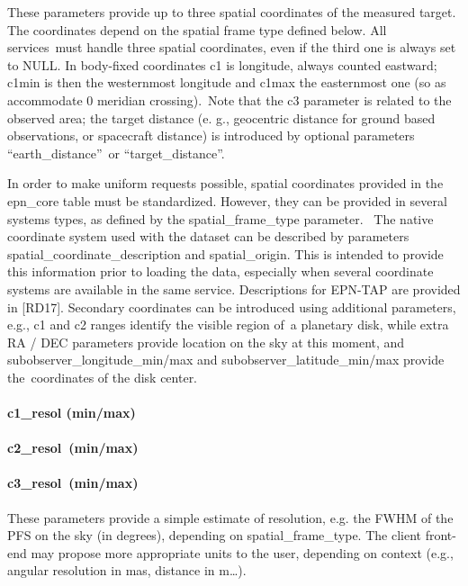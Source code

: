 \documentclass[11pt,a4paper]{ivoa}
\begin{document}
These parameters provide up to three spatial coordinates of the measured target. The coordinates depend on the spatial frame type defined below. All services must handle three spatial coordinates, even if the third one is always set to NULL. In body-fixed coordinates c1 is longitude, always counted eastward; c1min is then the westernmost longitude and c1max the easternmost one (so as accommodate 0 meridian crossing). Note that the c3 parameter is related to the observed area; the target distance (e. g., geocentric distance for ground based observations, or spacecraft distance) is introduced by optional parameters  ``earth\_distance'' or ``target\_distance''.

In order to make uniform requests possible, spatial coordinates provided in the epn\_core table must be standardized. However, they can be provided in several systems types, as defined by the spatial\_frame\_type parameter.  The native coordinate system used with the dataset can be described by parameters spatial\_coordinate\_description and spatial\_origin. This is intended to provide this information prior to loading the data, especially when several coordinate systems are available in the same service. Descriptions for EPN-TAP are provided in [RD17]. Secondary coordinates can be introduced using additional parameters, e.g., c1 and c2 ranges identify the visible region of a planetary disk, while extra RA / DEC parameters provide location on the sky at this moment, and subobserver\_longitude\_min/max and subobserver\_latitude\_min/max provide the coordinates of the disk center.

\paragraph{c1\_resol (min/max)}

\paragraph{c2\_resol (min/max)}

\paragraph{c3\_resol (min/max)}

These parameters provide a simple estimate of resolution, e.g. the FWHM of the PFS on the sky (in degrees), depending on spatial\_frame\_type. The client front-end may propose more appropriate units to the user, depending on context (e.g., angular resolution in mas, distance in m…).
\end{document}
